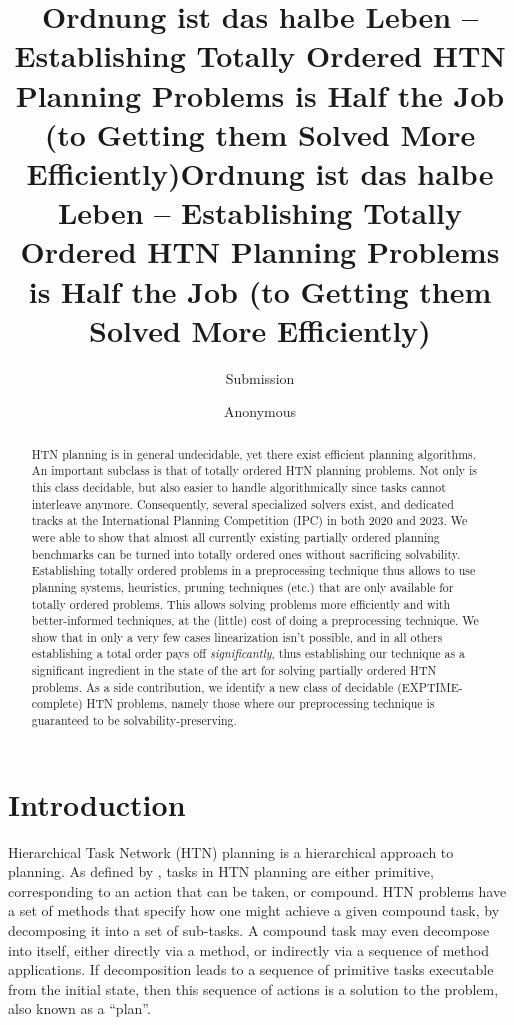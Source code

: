 \documentclass[letterpaper]{article} %
\author {
    Submission
}
\title{Ordnung ist das halbe Leben -- Establishing Totally Ordered HTN
	Planning Problems is Half the Job (to Getting them Solved More Efficiently)}
\author {
    Anonymous

}
\title{Ordnung ist das halbe Leben -- Establishing Totally Ordered HTN
	Planning Problems is Half the Job (to Getting them Solved More Efficiently)}
\begin{document}
\maketitle

\begin{abstract} 
HTN planning is in general undecidable, yet there exist efficient
planning algorithms. An important subclass is that of totally ordered
HTN planning problems. Not only is this class decidable, but also easier
to handle algorithmically since tasks cannot interleave anymore.
Consequently, several specialized solvers exist, and dedicated tracks at
the International Planning Competition (IPC) in both 2020 and 2023. We
were able to show that almost all currently existing partially ordered
planning benchmarks can be turned into totally ordered ones without
sacrificing solvability. Establishing totally ordered problems in a
preprocessing technique thus allows to use planning systems, heuristics,
pruning techniques (etc.) that are only available for totally ordered
problems. This allows solving problems more efficiently and with
better-informed techniques, at the (little) cost of doing a
preprocessing technique. We show that in only a very few cases
linearization isn't possible, and in all others establishing a total
order pays off \emph{significantly}, thus establishing our technique as
a significant ingredient in the state of the art for solving partially
ordered HTN problems. As a side contribution, we identify a new class of
decidable (EXPTIME-complete) HTN problems, namely those where our
preprocessing technique is guaranteed to be solvability-preserving.
\end{abstract}
 
 

 
 
 
\section{Introduction}
Hierarchical Task Network (HTN) planning is a hierarchical approach to planning. As defined by \cite{HTNSurvey},  %
tasks in HTN planning are either primitive, corresponding to an action that can be taken, or compound. HTN problems have a set of methods that specify how one might achieve a given compound task, by decomposing it into a set of sub-tasks. A compound task may even decompose into itself, either directly via a method, or indirectly via a sequence of method applications. If decomposition leads to a sequence of primitive tasks executable from the initial state, then this sequence of actions is a solution to the problem, also known as a \enquote{plan}. 
\end{document}

